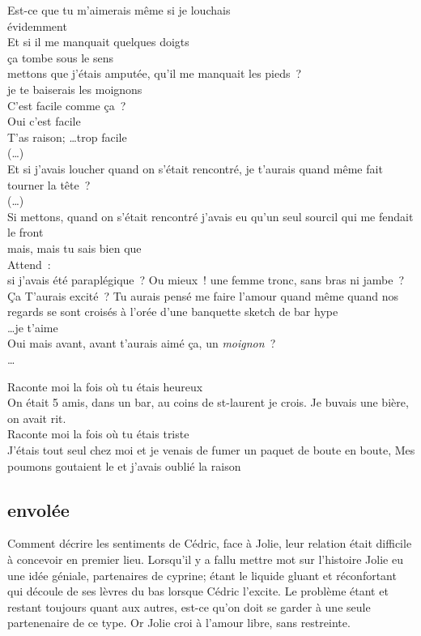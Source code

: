 \documentclass{article}
\begin{document}
Est-ce que tu m’aimerais même si je louchais\\
évidemment\\
Et si il me manquait quelques doigts\\
ça tombe sous le sens\\
mettons que j’étais amputée, qu’il me manquait les pieds ?\\
je te baiserais les moignons\\
C’est facile comme ça ?\\
Oui c’est facile\\
T’as raison; \ldots trop facile\\
(…)\\
Et si j’avais loucher quand on s’était rencontré, je t’aurais quand même fait tourner la tête ?\\
(…)\\
Si mettons, quand on s’était rencontré j'avais eu qu’un seul sourcil qui me
fendait le front\\
mais, mais tu sais bien que\\
Attend :\\
si j’avais été paraplégique ? Ou mieux ! une femme tronc, sans bras ni
jambe ? Ça T’aurais excité ? Tu aurais pensé me faire l’amour quand même quand
nos regards se sont croisés à l’orée d’une banquette sketch de bar hype\\

\ldots je t’aime\\
Oui mais avant, avant t’aurais aimé ça, un \textit{moignon} ? \\

\ldots

Raconte moi la fois où tu étais heureux\\
On était 5 amis, dans un bar, au coins de st-laurent je crois.
Je buvais une bière, on avait rit.\\
Raconte moi la fois où tu étais triste\\
J'étais tout seul chez moi et je venais de fumer
un paquet de boute en boute, Mes poumons goutaient le
et j'avais oublié la raison
\clearpage

\subsection{envolée}

Comment décrire les sentiments de Cédric, face à Jolie, leur relation était
difficile à concevoir en premier lieu. Lorsqu'il y a fallu mettre mot sur
l'histoire Jolie eu une idée géniale, partenaires de cyprine; étant le liquide
gluant et réconfortant qui découle de ses lèvres du bas lorsque Cédric l'excite.
Le problème étant et restant toujours quant aux autres, est-ce qu'on doit se
garder à une seule partenenaire de ce type. Or Jolie croi à l'amour libre, sans
restreinte.\\
\end{document}
